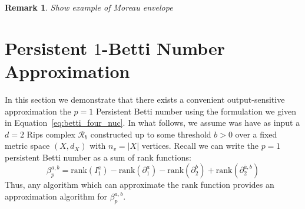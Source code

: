 \documentclass[10pt]{article}
\newtheorem{remark}{Remark}
\begin{document}
\begin{remark}
	Show example of Moreau envelope 
\end{remark}



\section{Persistent $1$-Betti Number Approximation}
In this section we demonstrate that there exists a convenient output-sensitive approximation the $p=1$ Persistent Betti number using the formulation we given in Equation~\ref{eq:betti_four_nuc}. 
In what follows, we assume was have as input a $d=2$ Rips complex $\mathcal{R}_b$ constructed up to some threshold $b > 0$ over a fixed metric space $(X, d_X)$ with $n_v = \lvert X \rvert$ vertices. 
Recall we can write the $p=1$ persistent Betti number as a sum of rank functions:
\begin{equation}\label{eq:betti_four_1}
	\beta_p^{a,b} = \mathrm{rank}(I_1^a) - \mathrm{rank}(\partial_1^a) - \mathrm{rank}(\partial_2^b) + \mathrm{rank}(\partial_2^{\bar{a},b})
\end{equation}
Thus, any algorithm which can approximate the $\mathrm{rank}$ function provides an approximation algorithm for $\beta_p^{a,b}$. 


%
%
\end{document}
